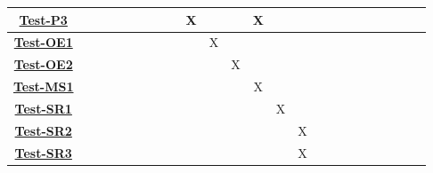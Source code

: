 \documentclass[12pt, titlepage]{article}
\begin{document}
\begin{table}[H]
\begin{adjustwidth}{-1.57in}{-1in}
{\begin{tabular}{c|c|c|c|c|c|c|c|c|c|c|c|c|c|c|c|c|c|c|c|c|c|c|c|}
\multicolumn{1}{|c|}{\hyperref[Test-P3]{\textbf{Test-P3}}}  &              &              &              &              &              &             &              &              &        X      &              &              &       X       &              &              &             &             &             &      &       & &   \\ \hline
\multicolumn{1}{|c|}{\hyperref[Test-OE1]{\textbf{Test-OE1}}}  &              &              &              &              &              &             &              &              &              &        X      &              &              &              &              &             &             &             &      &      & &   \\ \hline
\multicolumn{1}{|c|}{\hyperref[Test-OE2]{\textbf{Test-OE2}}}  &              &              &              &              &              &             &              &              &              &              &    X          &              &              &              &             &             &             &      &      & &    \\ \hline
\multicolumn{1}{|c|}{\hyperref[Test-MS1]{\textbf{Test-MS1}}}  &              &              &              &              &              &             &              &              &              &              &              &         X     &              &              &             &             &             &      &      & &    \\ \hline
\multicolumn{1}{|c|}{\hyperref[Test-SR1]{\textbf{Test-SR1}}}  &              &              &              &              &              &             &              &              &              &              &              &              &      X        &              &             &             &             &      &      & &    \\ \hline
\multicolumn{1}{|c|}{\hyperref[Test-SR2]{\textbf{Test-SR2}}}  &              &              &              &              &              &             &              &              &              &              &             &              &              &       X       &             &             &             &      &      & &    \\ \hline
\multicolumn{1}{|c|}{\hyperref[Test-SR3]{\textbf{Test-SR3}}}  &              &              &              &              &              &             &              &              &              &              &              &              &              &        X      &             &             &             &      &      & &    \\ \hline

\end{tabular}}
\end{adjustwidth}
\end{table}
\end{document}
